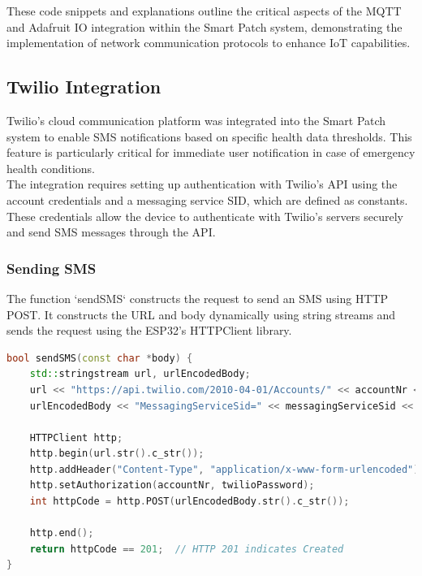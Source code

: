 \noindent These code snippets and explanations outline the critical aspects of the MQTT and Adafruit IO integration within the Smart Patch system, demonstrating the implementation of network communication protocols to enhance IoT capabilities.



\subsection{Twilio Integration}

Twilio's cloud communication platform was integrated into the Smart Patch system to enable SMS notifications based on specific health data thresholds. This feature is particularly critical for immediate user notification in case of emergency health conditions. \\

\noindent The integration requires setting up authentication with Twilio's API using the account credentials and a messaging service SID, which are defined as constants. These credentials allow the device to authenticate with Twilio's servers securely and send SMS messages through the API.

\subsubsection{Sending SMS}

The function `sendSMS` constructs the request to send an SMS using HTTP POST. It constructs the URL and body dynamically using string streams and sends the request using the ESP32's HTTPClient library.

\begin{lstlisting}[language=C++, caption={Function to Send SMS via Twilio}]
bool sendSMS(const char *body) {
    std::stringstream url, urlEncodedBody;
    url << "https://api.twilio.com/2010-04-01/Accounts/" << accountNr << "/Messages";
    urlEncodedBody << "MessagingServiceSid=" << messagingServiceSid << "&To=" << to.c_str() << "&Body=" << body;

    HTTPClient http;
    http.begin(url.str().c_str());
    http.addHeader("Content-Type", "application/x-www-form-urlencoded");
    http.setAuthorization(accountNr, twilioPassword);
    int httpCode = http.POST(urlEncodedBody.str().c_str());

    http.end();
    return httpCode == 201;  // HTTP 201 indicates Created
}
\end{lstlisting}

